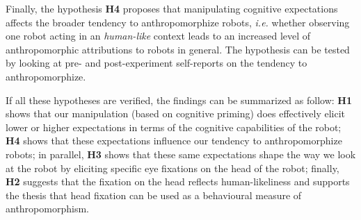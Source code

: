 \documentclass[lettersize, noapacite, twoside, HRI]{apa_HRI}
\newcommand{\ie}{\textit{i.e.}\xspace}
\newcommand{\h}[1]{\textbf{H#1}\xspace}
\begin{document}
Finally, the hypothesis \h{4} proposes that manipulating cognitive expectations
affects the broader tendency to anthropomorphize robots, \ie whether observing one
robot acting in an \emph{human-like} context leads to an increased level of
anthropomorphic attributions to robots in general. The hypothesis can be
tested by looking at pre- and post-experiment self-reports on the tendency to
anthropomorphize.

If all these hypotheses are verified, the findings can be summarized as follow:
\h{1} shows that our manipulation (based on cognitive priming) does effectively
elicit lower or higher expectations in terms of the cognitive capabilities of
the robot; \h{4} shows that these expectations influence our tendency to
anthropomorphize robots; in parallel, \h{3} shows that these same expectations
shape the way we look at the robot by eliciting specific eye fixations on the
head of the robot; finally, \h{2} suggests that the fixation on the head
reflects human-likeliness and supports the thesis that head fixation can be used
as a behavioural measure of anthropomorphism.

%
%
%
%
%
%
%
\end{document}
